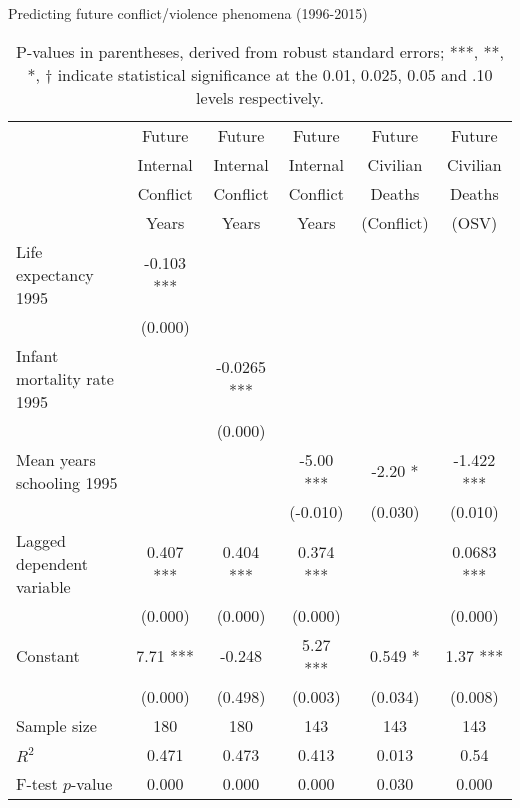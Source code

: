 \begin{table}[!htb]
\centering
\caption{Predicting future conflict/violence phenomena (1996-2015)}
\label{table_cs_violence}
\begin{tabular}{lccccc}
\toprule
                               & Future          & Future          & Future      & Future     & Future \\
                               & Internal        & Internal        & Internal    & Civilian   & Civilian \\
                               & Conflict        & Conflict        & Conflict    & Deaths     & Deaths\\
                               & Years           & Years           & Years       & (Conflict) & (OSV) \\
\midrule
Life expectancy 1995           & -0.103 ***      &                 &             &            & \\
                               & (0.000)         &                 &             &            & \\
Infant mortality rate 1995     &                 & -0.0265 ***     &             &            & \\
                               &                 & (0.000)         &             &            & \\
Mean years schooling 1995      &                 &                 & -5.00 ***   & -2.20 *    & -1.422 *** \\
                               &                 &                 & (-0.010)    & (0.030)    & (0.010) \\
Lagged dependent variable      & 0.407 ***       & 0.404 ***       & 0.374 ***   &            & 0.0683 *** \\
                               & (0.000)         & (0.000)         & (0.000)     &            & (0.000) \\
Constant                       & 7.71 ***        & -0.248          & 5.27 ***    & 0.549 *    & 1.37 *** \\
                               & (0.000)         & (0.498)         & (0.003)     & (0.034)    & (0.008) \\
\midrule
Sample size                    & 180             & 180             & 143         & 143        & 143 \\
$R^2$                          & 0.471           & 0.473           & 0.413       & 0.013      & 0.54 \\
F-test $p$-value               & 0.000           & 0.000           & 0.000       & 0.030      & 0.000 \\
\bottomrule
\end{tabular}
\caption*{P-values in parentheses, derived from robust standard errors; ***, **, *, † indicate statistical significance at the 0.01, 0.025, 0.05 and .10 levels respectively.}
\end{table}

